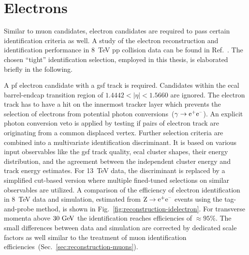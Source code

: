 \section{Electrons}
\label{sec:reconstruction-electrons}

Similar to muon candidates, electron candidates are required to pass certain identification criteria as well. A study of the electron reconstruction and identification performance in 8~TeV \gls{pp} collision data can be found in Ref.~\cite{Khachatryan:2015hwa}. The chosen ``tight'' identification selection, employed in this thesis, is elaborated briefly in the following.

A \gls{pf} electron candidate with a \gls{gsf} track is required. Candidates within the \gls{ecal} barrel-endcap transition region of $1.4442<|\eta|<1.5660$ are ignored. The electron track has to have a hit on the innermost tracker layer which prevents the selection of electrons from potential photon conversions~($\gamma\to\mathrm{e}^{\rmplus}\mathrm{e}^{\rmminus}$). An explicit photon conversion veto is applied by testing if pairs of electron track are originating from a common displaced vertex. Further selection criteria are combined into a multivariate identification discriminant. It is based on various input observables like the \gls{gsf} track quality, \gls{ecal} cluster shapes, their energy distribution, and the agreement between the independent cluster energy and track energy estimates. For 13~TeV data, the discriminant is replaced by a simplified cut-based version where multiple fined-tuned selections on similar observables are utilized. A comparison of the efficiency of electron identification in 8~TeV data and simulation, estimated from $\mathrm{Z}\to\mathrm{e}^{\rmplus}\mathrm{e}^{\rmminus}$ events using the tag-and-probe method, is shown in Fig.~\ref{fig:reconstruction-idelectron}. For transverse momenta above $30~\textrm{GeV}$ the identification reaches efficiencies of $\approx95\%$. The small differences between data and simulation are corrected by dedicated scale factors as well similar to the treatment of muon identification efficiencies~(Sec.~\ref{sec:reconstruction-muons}).



